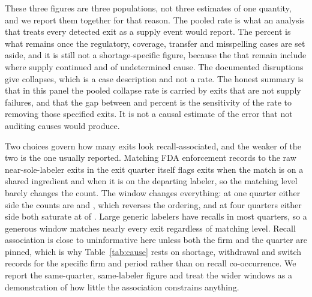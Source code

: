 \documentclass[pdflatex,sn-vancouver-num,Numbered]{sn-jnl}
\begin{document}
These three figures are three populations, not three estimates of one quantity, and we report
them together for that reason. The pooled rate is what an analysis that treats every detected
exit as a supply event would report. The \nCollRemRate percent is what remains once the
regulatory, coverage, transfer and misspelling cases are set aside, and it is still not a
shortage-specific figure, because the \nCollRemN that remain include \nCauseContinuedW where
supply continued and \nCauseUndeterminedW of undetermined cause. The \nCollSupplyN documented
disruptions give \nCollSupplyColl collapses, which is a case description and not a rate. The
honest summary is that in this panel the pooled collapse rate is carried by exits that are not
supply failures, and that the gap between \nCollPooledRate and \nCollRemRate percent is the
sensitivity of the rate to removing those specified exits. It is not a causal estimate of the
error that not auditing causes would produce.

\begin{table}[htbp]
\small
\caption{Collapse below two percent of baseline dispensing, by what the exit is verified to be.
The lower block is three different populations rather than three estimates of one rate: every
observed exit, then those the explained classes leave behind, then the documented supply
disruptions alone. Rates on one or two events are reported for completeness and carry no
inference.}\label{tab:collapse}

\end{table}

Two choices govern how many exits look recall-associated, and the weaker of the two is the one
usually reported. Matching FDA enforcement records to the \nRawSoleW raw near-sole-labeler exits in the
exit quarter itself flags \nRecallIngLevel exits when the match is on a shared ingredient and
\nRecallLabLevel when it is on the departing labeler, so the matching level barely changes the
count. The window changes everything: at one quarter either side the counts are
\nRecallIngMid and \nRecallLabMid, which reverses the ordering, and at four quarters either side
both saturate at \nRecallIngWide of \nRawSoleW. Large generic labelers have recalls in most quarters, so a
generous window matches nearly every exit regardless of matching level. Recall association is
close to uninformative here unless both the firm and the quarter are pinned, which is why
Table~\ref{tab:cause} rests on shortage, withdrawal and switch records for the specific firm and
period rather than on recall co-occurrence. We report the same-quarter, same-labeler figure and
treat the wider windows as a demonstration of how little the association constrains anything.
\end{document}
